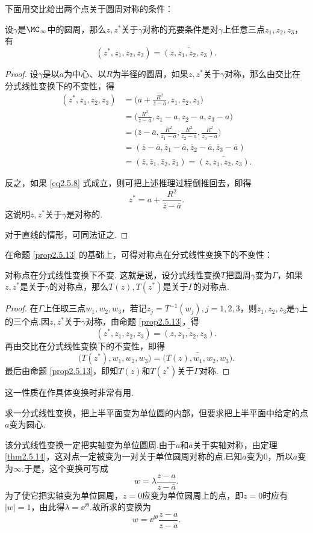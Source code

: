 下面用交比给出两个点关于圆周对称的条件：
\begin{prop}\label{prop2.5.13}
设$\gamma$是$\MC_\infty$中的圆周，那么$z,z^\ast$关于$\gamma$对称的充要条件是对$\gamma$上任意三点$z_1,z_2,z_3$，有
\begin{equation}\label{eq2.5.8}
(z^\ast,z_1,z_2,z_3)=\bar{(z,z_1,z_2,z_3)}.
\end{equation}
\end{prop}
\begin{proof}
设$\gamma$是以$a$为中心、以$R$为半径的圆周，如果$z,z^\ast$关于$\gamma$对称，那么由交比在分式线性变换下的不变性，得
\begin{align*}
(z^\ast,z_1,z_2,z_3)&=\bigg(a+\frac{R^2}{\bar z-\bar a},z_1,z_2,z_3\bigg)\\
&=\bigg(\frac{R^2}{\bar z-\bar a},z_1-a,z_2-a,z_3-a\bigg)\\
&=\bigg(\bar z-\bar a,\frac{R^2}{z_1-a},\frac{R^2}{z_2-a},\frac{R^2}{z_3-a}\bigg)\\
&=(\bar z-\bar a,\bar z_1-\bar a,\bar z_2-\bar a,\bar z_3-\bar a)\\
&=(\bar z,\bar z_1,\bar z_2,\bar z_3)=\bar{(z,z_1,z_2,z_3)}.
\end{align*}

反之，如果 \eqref{eq2.5.8} 式成立，则可把上述推理过程倒推回去，即得
\[z^\ast=a+\frac{R^2}{\bar z-\bar a}.\]
这说明$z,z^\ast$关于$\gamma$是对称的.

对于直线的情形，可同法证之.
\end{proof}

在命题 \ref{prop2.5.13} 的基础上，可得对称点在分式线性变换下的不变性：
\begin{theorem}\label{thm2.5.14}
对称点在分式线性变换下不变. 这就是说，设分式线性变换$T$把圆周$\gamma$变为$\Gamma$，如果$z,z^\ast$是关于$\gamma$的对称点，那么$T(z),T(z^\ast)$是关于$\Gamma$的对称点.
\end{theorem}
\begin{proof}
在$\Gamma$上任取三点$w_1,w_2,w_3$，若记$z_j=T^{-1}(w_j),j=1,2,3$，则$z_1,z_2,z_3$是$\gamma$上的三个点.因$z,z^\ast$关于$\gamma$对称，由命题 \ref{prop2.5.13}，得
\[(z^\ast,z_1,z_2,z_3)=\bar{(z,z_1,z_2,z_3)}.\]
再由交比在分式线性变换下的不变性，即得
\[\big(T(z^\ast),w_1,w_2,w_3\big)=\bar{\big(T(z),w_1,w_2,w_3\big)}.\]
最后由命题 \ref{prop2.5.13}，即知$T(z)$和$T(z^\ast)$关于$\Gamma$对称.
\end{proof}

这一性质在作具体变换时非常有用.
\begin{example}\label{exam2.5.15}
求一分式线性变换，把上半平面变为单位圆的内部，但要求把上半平面中给定的点$a$变为圆心.
\end{example}
\begin{solution}
该分式线性变换一定把实轴变为单位圆周.由于$a$和$\bar a$关于实轴对称，由定理 \ref{thm2.5.14}，这对点一定被变为一对关于单位圆周对称的点.已知$a$变为$0$，所以$\bar a$变为$\infty$.于是，这个变换可写成
\[w=\lambda\frac{z-a}{z-\bar a}.\]
为了使它把实轴变为单位圆周，$z=0$应变为单位圆周上的点，即$z=0$时应有$|w|=1$，由此得$\lambda=\ee^{\ii\theta}$.故所求的变换为
\[w=\ee^{\ii\theta}\frac{z-a}{z-\bar a}.\]
\end{solution}

